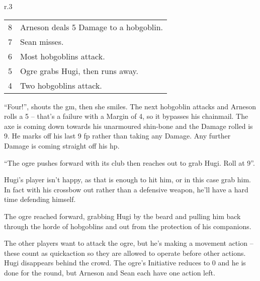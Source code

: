 \begin{exampletext}
\begin{wrapfigure}{r}{.3\textwidth}
\begin{tabularx}{.3\textwidth}{c|X}
    8 & Arneson deals 5 Damage to a hobgoblin. \\

    7 & Sean misses. \\

    6 & Most hobgoblins attack. \\

    5 & Ogre grabs Hugi, then runs away. \\
    4 & Two hobgoblins attack. \\

  \end{tabularx}

\end{wrapfigure}

``Four!'', shouts the \gls{gm}, then she smiles. The next hobgoblin attacks and Arneson rolls a 5 -- that's a failure with a Margin of 4, so it bypasses his chainmail. The axe is coming down towards his unarmoured shin-bone and the Damage rolled is 9. He marks off his last 9 \gls{fp} rather than taking any Damage. Any further Damage is coming straight off his \gls{hp}.

``The ogre pushes forward with its club then reaches out to grab Hugi. Roll at  9''.

Hugi's player isn't happy, as that is enough to hit him, or in this case grab him. In fact with his crossbow out rather than a defensive weapon, he'll have a hard time defending himself.

The ogre reached forward, grabbing Hugi by the beard and pulling him back through the horde of hobgoblins and out from the protection of his companions.

The other players want to attack the ogre, but he's making a movement action -- these count as \gls{quickaction} so they are allowed to operate before other actions.
Hugi disappears behind the crowd.
The ogre's Initiative reduces to 0 and he is done for the \gls{round}, but Arneson and Sean each have one action left.

\end{exampletext}

